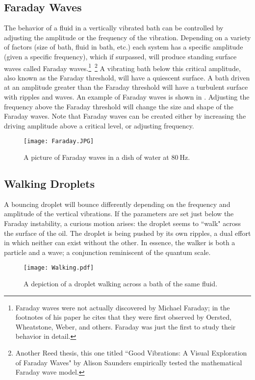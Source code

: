 \subsection*{Faraday Waves}
	    The behavior of a fluid in a vertically vibrated bath can be controlled by adjusting the amplitude or the frequency of the vibration. Depending on a variety of factors (size of bath, fluid in bath, etc.) each system has a specific amplitude (given a specific frequency), which if surpassed, will produce standing surface waves called Faraday waves.\footnote{Faraday waves were not actually discovered by Michael Faraday; in the footnotes of his paper he cites that they were first observed by Oersted, Wheatstone, Weber, and others. Faraday was just the first to study their behavior in detail.}~\footnote{Another Reed thesis, this one titled ``Good Vibrations: A Visual Exploration of Faraday Waves" by Alison Saunders empirically tested the mathematical Faraday wave model. } A vibrating bath below this critical amplitude, also known as the Faraday threshold, will have a quiescent surface. A bath driven at an amplitude greater than the Faraday threshold will have a turbulent surface with ripples and waves. An example of Faraday waves is shown in . Adjusting the frequency above the Faraday threshold will change the size and shape of the Faraday waves. Note that Faraday waves can be created either by increasing the driving amplitude above a critical level, or adjusting frequency.	    
	    \begin{figure}[h!]
	\centering
	\texttt{[image: Faraday.JPG]}
	\caption{A picture of Faraday waves in a dish of water at $80~\mathrm{Hz}$.}
	\label{faraday waves}
\end{figure}

\subsection*{Walking Droplets}
	    
	A bouncing droplet will bounce differently depending on the frequency and amplitude of the vertical vibrations. If the parameters are set just below the Faraday instability, a curious motion arises: the droplet seems to ``walk" across the surface of the oil. The droplet is being pushed by its own ripples, a dual effort in which neither can exist without the other. In essence, the walker is both a particle and a wave; a conjunction reminiscent of the quantum scale. 
	  
\begin{figure}[h!]
	\centering
	\texttt{[image: Walking.pdf]}
	\caption{A depiction of a droplet walking across a bath of the same fluid.}
	\label{bounce}
\end{figure}
	    
